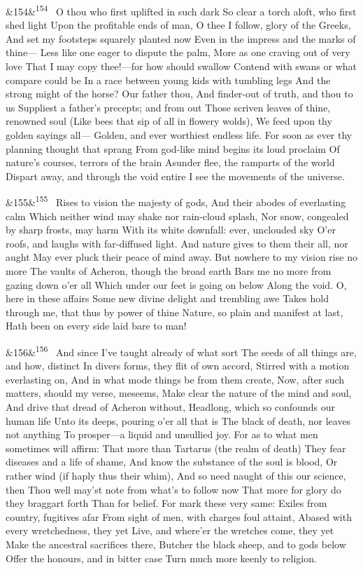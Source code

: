 \documentclass[12pt]{article}
\newcommand{\para}[1][]{\par\noindent\ifx&#1&\else\textsuperscript{\footnotesize #1}~\fi}
\begin{document}
\para[154] O thou who first uplifted in such dark So clear a torch aloft, who first shed light Upon the profitable ends of man, O thee I follow, glory of the Greeks, And set my footsteps squarely planted now Even in the impress and the marks of thine--- Less like one eager to dispute the palm, More as one craving out of very love That I may copy thee!---for how should swallow Contend with swans or what compare could be In a race between young kids with tumbling legs And the strong might of the horse? Our father thou, And finder-out of truth, and thou to us Suppliest a father's precepts; and from out Those scriven leaves of thine, renowned soul (Like bees that sip of all in flowery wolds), We feed upon thy golden sayings all--- Golden, and ever worthiest endless life. For soon as ever thy planning thought that sprang From god-like mind begins its loud proclaim Of nature's courses, terrors of the brain Asunder flee, the ramparts of the world Dispart away, and through the void entire I see the movements of the universe.

\para[155] Rises to vision the majesty of gods, And their abodes of everlasting calm Which neither wind may shake nor rain-cloud splash, Nor snow, congealed by sharp frosts, may harm With its white downfall: ever, unclouded sky O'er roofs, and laughs with far-diffused light. And nature gives to them their all, nor aught May ever pluck their peace of mind away. But nowhere to my vision rise no more The vaults of Acheron, though the broad earth Bars me no more from gazing down o'er all Which under our feet is going on below Along the void. O, here in these affairs Some new divine delight and trembling awe Takes hold through me, that thus by power of thine Nature, so plain and manifest at last, Hath been on every side laid bare to man!

\para[156] And since I've taught already of what sort The seeds of all things are, and how, distinct In divers forms, they flit of own accord, Stirred with a motion everlasting on, And in what mode things be from them create, Now, after such matters, should my verse, meseems, Make clear the nature of the mind and soul, And drive that dread of Acheron without, Headlong, which so confounds our human life Unto its deeps, pouring o'er all that is The black of death, nor leaves not anything To prosper---a liquid and unsullied joy. For as to what men sometimes will affirm: That more than Tartarus (the realm of death) They fear diseases and a life of shame, And know the substance of the soul is blood, Or rather wind (if haply thus their whim), And so need naught of this our science, then Thou well may'st note from what's to follow now That more for glory do they braggart forth Than for belief. For mark these very same: Exiles from country, fugitives afar From sight of men, with charges foul attaint, Abased with every wretchedness, they yet Live, and where'er the wretches come, they yet Make the ancestral sacrifices there, Butcher the black sheep, and to gods below Offer the honours, and in bitter case Turn much more keenly to religion.
\end{document}
